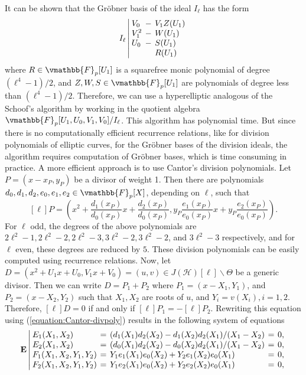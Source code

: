 It can be shown that the Gr\"{o}bner basis of the ideal $I_\ell$ has the form
$$
I_\ell \left|
\setlength\arraycolsep{2pt}
\begin{array}{lll}
V_0 & - & V_1Z(U_1) \\
V_1^2 & - & W(U_1) \\
U_0 & - & S(U_1) \\
&& R(U_1) 
\end{array}
\right.
$$
where $R \in \vmathbb{F}_p[U_1]$ is a squarefree monic polynomial of degree $(\ell^4 - 1) / 2$, and 
$Z, W, S \in \vmathbb{F}_p[U_1]$ are polynomials of degree less than $(\ell^4 - 1) / 2$. Therefore, 
we can use a hyperelliptic analogous of the Schoof's algorithm by working in the quotient algebra 
$\vmathbb{F}_p[U_1, U_0, V_1, V_0] / I_\ell$. This algorithm has polynomial time. But since there is 
no computationally efficient recurrence relations, like for division polynomials of elliptic curves, 
for the Gr\"{o}bner bases of the division ideals, the algorithm requires computation of Gr\"{o}bner 
bases, which is time consuming in practice. A more efficient approach is to use Cantor's division 
polynomials. Let $P = (x - x_P, y_P)$ be a divisor of weight 1. Then there are polynomials $d_0, 
d_1, d_2, e_0, e_1, e_2 \in \vmathbb{F}_p[X]$, depending on $\ell$, such that
\begin{equation}
\label{equation:Cantor-divpoly}
[\ell]P = \left( x^2 + \frac{d_1(x_P)}{d_0(x_P)}x + \frac{d_2(x_P)}{d_0(x_P)}, 
y_P\frac{e_1(x_P)}{e_0(x_P)}x + y_P\frac{e_2(x_P)}{e_0(x_P)}\right).
\end{equation}
For $\ell$ odd, the degrees of the above polynomials are $2\ell^2 - 1, 2\ell^2 - 2, 2\ell^2 - 3, 
3\ell^2 - 2, 3\ell^2 - 2$, and $3\ell^2 - 3$ respectively, and for $\ell$ even, these degrees are 
reduced by $5$. These division polynomials can be easily computed using recurrence relations. Now, 
let $D = (x^2 + U_1x + U_0, V_1x + V_0) = (u, v) \in J(\mathcal{H})[\ell] \backslash \Theta$ be a 
generic divisor. Then we can write $D = P_1 + P_2$ where $P_1 = (x - X_1, Y_1)$, and $P_2 = (x - 
X_2, Y_2)$ such that $X_1, X_2$ are roots of $u$, and $Y_i = v(X_i), i = 1, 2$. Therefore, $[\ell]D 
= 0$ if and only if $[\ell]P_1 = -[\ell]P_2$. Rewriting this equation using 
(\ref{equation:Cantor-divpoly}) results in the following system of equations
$$
\mathbf{E} \left|
\setlength\arraycolsep{2pt}
\begin{array}{lllll}
E_1(X_1, X_2) & = & (d_1(X_1)d_2(X_2) - d_1(X_2)d_2(X_1) / (X_1 - X_2) & = & 0, \\
E_2(X_1, X_2) & = & (d_0(X_1)d_2(X_2) - d_0(X_2)d_2(X_1) / (X_1 - X_2) & = & 0, \\
F_1(X_1, X_2, Y_1, Y_2) & = & Y_1e_1(X_1)e_0(X_2) + Y_2e_1(X_2)e_0(X_1) & = & 0, \\
F_2(X_1, X_2, Y_1, Y_2) & = & Y_1e_2(X_1)e_0(X_2) + Y_2e_2(X_2)e_0(X_1) & = & 0, \\
\end{array}
\right.
$$
